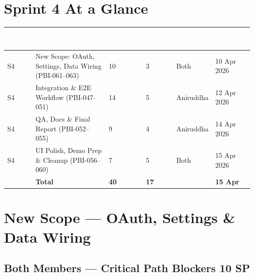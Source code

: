 \documentclass[10pt,a4paper]{article}
\begin{document}
\vspace{0.8em}

\section{Sprint 4 At a Glance}

\renewcommand{\arraystretch}{1.4}
\begin{tabularx}{\textwidth}{|L{1.3cm}|X|L{2cm}|L{1.8cm}|L{1.3cm}|L{2cm}|}
\hline
{}
\textcolor{white}{\textbf{Sprint}} &
\textcolor{white}{\textbf{Workstream}} &
\textcolor{white}{\textbf{Planned SP}} &
\textcolor{white}{\textbf{Stories}} &
\textcolor{white}{\textbf{Lead}} &
\textcolor{white}{\textbf{Deadline}} \\ \hline
S4 & New Scope: OAuth, Settings, Data Wiring (PBI-061–063)    & 10 &  3 & Both      & 10 Apr 2026 \\ \hline
S4 & Integration \& E2E Workflow (PBI-047–051)                & 14 &  5 & Aniruddha & 12 Apr 2026 \\ \hline
S4 & QA, Docs \& Final Report (PBI-052–055)                   &  9 &  4 & Aniruddha & 14 Apr 2026 \\ \hline
S4 & UI Polish, Demo Prep \& Cleanup (PBI-056–060)            &  7 &  5 & Both      & 15 Apr 2026 \\ \hline
{}
   & \textbf{Total}                                            & \textbf{40} & \textbf{17} & & \textbf{15 Apr} \\ \hline
\end{tabularx}

\newpage

\section{New Scope — OAuth, Settings \& Data Wiring}

\subsection*{Both Members — Critical Path Blockers \hfill 10 SP}
\end{document}
